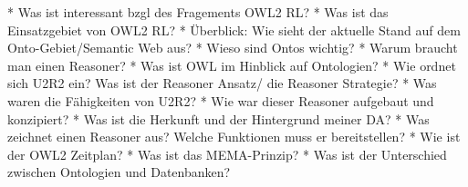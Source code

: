     * Was ist interessant bzgl des Fragements OWL2 RL?
    * Was ist das Einsatzgebiet von OWL2 RL?
    * Überblick: Wie sieht der aktuelle Stand auf dem Onto-Gebiet/Semantic Web aus?
    * Wieso sind Ontos wichtig?
    * Warum braucht man einen Reasoner?
    * Was ist OWL im Hinblick auf Ontologien?
    * Wie ordnet sich U2R2 ein? Was ist der Reasoner Ansatz/ die Reasoner Strategie?
    * Was waren die Fähigkeiten von U2R2?
    * Wie war dieser Reasoner aufgebaut und konzipiert?
    * Was ist die Herkunft und der Hintergrund meiner DA?
    * Was zeichnet einen Reasoner aus? Welche Funktionen muss er bereitstellen?
    * Wie ist der OWL2 Zeitplan?
    * Was ist das MEMA-Prinzip?
    * Was ist der Unterschied zwischen Ontologien und Datenbanken? 